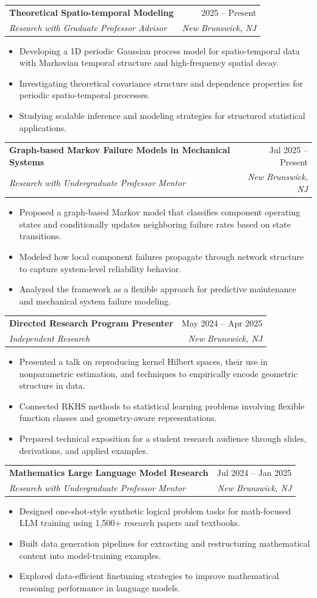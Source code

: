 \documentclass[letterpaper,10pt]{article}
\makeatletter
\newcommand{\resumeItem}[1]{
  \item\footnotesize{#1\vspace{-1pt}}
}
\newcommand{\resumeSubheading}[4]{
  \vspace{-2pt}\item
    \begin{tabular*}{0.97\textwidth}[t]{l@{\extracolsep{\fill}}r}
      \textbf{#1} & #2 \\
      \textit{\footnotesize #3} & \textit{\footnotesize #4} \\
    \end{tabular*}\vspace{-6pt}
}
\newcommand{\resumeItemListStart}{\begin{itemize}[leftmargin=0.15in, itemsep=1pt, topsep=1pt]}
\newcommand{\resumeItemListEnd}{\end{itemize}\vspace{-4pt}}
\makeatother
\begin{document}
\resumeSubheading
  {Theoretical Spatio-temporal Modeling}{2025 -- Present}
  {Research with Graduate Professor Advisor}{New Brunswick, NJ}
  \resumeItemListStart
    \resumeItem{Developing a 1D periodic Gaussian process model for spatio-temporal data with Markovian temporal structure and high-frequency spatial decay.}
    \resumeItem{Investigating theoretical covariance structure and dependence properties for periodic spatio-temporal processes.}
    \resumeItem{Studying scalable inference and modeling strategies for structured statistical applications.}
  \resumeItemListEnd

\resumeSubheading
  {Graph-based Markov Failure Models in Mechanical Systems}{Jul 2025 -- Present}
  {Research with Undergraduate Professor Mentor}{New Brunswick, NJ}
  \resumeItemListStart
    \resumeItem{Proposed a graph-based Markov model that classifies component operating states and conditionally updates neighboring failure rates based on state transitions.}
    \resumeItem{Modeled how local component failures propagate through network structure to capture system-level reliability behavior.}
    \resumeItem{Analyzed the framework as a flexible approach for predictive maintenance and mechanical system failure modeling.}
  \resumeItemListEnd

\resumeSubheading
  {Directed Research Program Presenter}{May 2024 -- Apr 2025}
  {Independent Research}{New Brunswick, NJ}
  \resumeItemListStart
    \resumeItem{Presented a talk on reproducing kernel Hilbert spaces, their use in nonparametric estimation, and techniques to empirically encode geometric structure in data.}
    \resumeItem{Connected RKHS methods to statistical learning problems involving flexible function classes and geometry-aware representations.}
    \resumeItem{Prepared technical exposition for a student research audience through slides, derivations, and applied examples.}
  \resumeItemListEnd

\resumeSubheading
  {Mathematics Large Language Model Research}{Jul 2024 -- Jan 2025}
  {Research with Undergraduate Professor Mentor}{New Brunswick, NJ}
  \resumeItemListStart
    \resumeItem{Designed one-shot-style synthetic logical problem tasks for math-focused LLM training using 1{,}500+ research papers and textbooks.}
    \resumeItem{Built data generation pipelines for extracting and restructuring mathematical content into model-training examples.}
    \resumeItem{Explored data-efficient finetuning strategies to improve mathematical reasoning performance in language models.}
  \resumeItemListEnd
\end{document}
